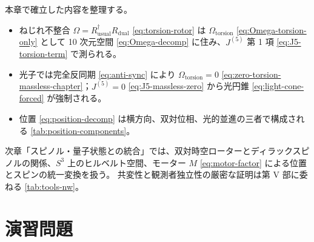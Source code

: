 \documentclass[dvipdfmx,a4paper,oneside]{jsbook}
\numberwithin{equation}{chapter}
\begin{document}
本章で確立した内容を整理する。

\begin{itemize}[leftmargin=2em]
  \item ねじれ不整合 \(\Omega = R_{\mathrm{usual}}^\dagger R_{\mathrm{dual}}\) \eqref{eq:torsion-rotor} は \(\Omega_{\mathrm{torsion}}\) \eqref{eq:Omega-torsion-only} として 10 次元空間 \eqref{eq:Omega-decomp} に住み、\(J^{(5)}\) 第 1 項 \eqref{eq:J5-torsion-term} で測られる。
  \item 光子では完全反同期 \eqref{eq:anti-sync} により \(\Omega_{\mathrm{torsion}} = 0\) \eqref{eq:zero-torsion-massless-chapter}；\(J^{(5)} = 0\) \eqref{eq:J5-massless-zero} から光円錐 \eqref{eq:light-cone-forced} が強制される。
  \item 位置 \eqref{eq:position-decomp} は横方向、双対位相、光的並進の三者で構成される \eqref{tab:position-components}。
\end{itemize}

次章「スピノル・量子状態との統合」では、双対時空ローターとディラックスピノルの関係、\(S^3\) 上のヒルベルト空間、モーター \(M\) \eqref{eq:motor-factor} による位置とスピンの統一変換を扱う。
共変性と観測者独立性の厳密な証明は第 V 部に委ねる \eqref{tab:tools-nw}。

\section*{演習問題}
\end{document}
